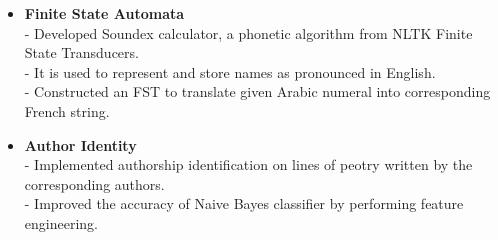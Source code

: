\begin{itemize}

 \item \textbf{Finite State Automata} \\
 - Developed Soundex calculator, a phonetic algorithm  from NLTK Finite State Transducers.\\
 - It is used to represent and store names as pronounced in English.\\
 - Constructed an FST to translate given Arabic numeral into corresponding French string.

 \item \textbf{Author Identity} \\
 - Implemented authorship identification on lines of peotry written by the corresponding authors.\\
 - Improved the accuracy of Naive Bayes classifier by performing feature engineering.


\end{itemize}

